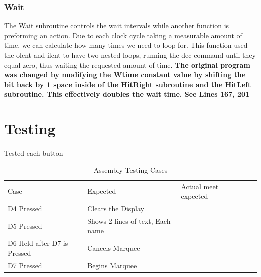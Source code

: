 \documentclass[12pt,letterpaper]{article}
\begin{document}
	\subsubsection{Wait}
	The Wait subroutine controls the wait intervals while another function is preforming an action. Due to each clock cycle taking a measurable amount of time, we can calculate how many times we need to loop for. This function used the olcnt and ilcnt to have two nested loops, running the dec command until they equal zero, thus waiting the requested amount of time. \textbf{The original program was changed by modifying the Wtime constant value by shifting the bit back by 1 space inside of the HitRight subroutine and the HitLeft subroutine. This effectively doubles the wait time. See Lines 167, 201}


\section{Testing}
Tested each button
\begin{table}[h]
	\centering
	\begin{tabular}{|l|l|l|ll}
		\cline{1-3}
		Case & Expected & Actual meet expected &  &  \\ \cline{1-3}
	D4 Pressed	&Clears the Display&	\checkmark  &  \\ \cline{1-3}
	D5 Pressed	&Shows 2 lines of text, Each name&	\checkmark	&  \\ \cline{1-3}
	D6 Held after D7 is Pressed	&Cancels Marquee&	\checkmark  &  \\ \cline{1-3}
	D7 Pressed	&Begins Marquee&	\checkmark	&  \\ \cline{1-3}
	
	\end{tabular}
\caption{Assembly Testing Cases}
\end{table}
\end{document}
